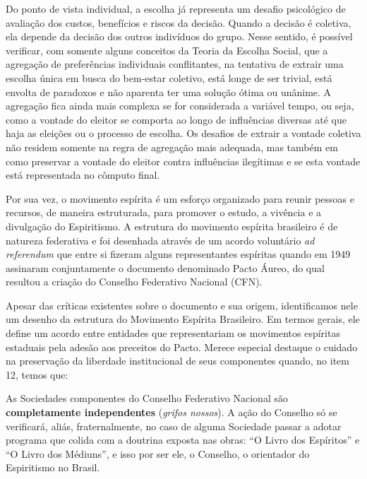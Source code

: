 \begin{citacao}
	Do ponto de vista individual, a escolha já representa um desafio psicológico de avaliação dos custos, benefícios e riscos da decisão. Quando a decisão é coletiva, ela depende da decisão dos outros indivíduos do grupo. Nesse sentido, é possível verificar, com somente alguns conceitos da Teoria da Escolha Social, que a agregação de preferências individuais conflitantes, na tentativa de extrair uma escolha única em busca do bem-estar coletivo, está longe de ser trivial, está envolta de paradoxos e não aparenta ter uma solução ótima ou unânime. A agregação fica ainda mais complexa se for considerada a variável tempo, ou seja, como a vontade do eleitor se comporta ao longo de influências diversas até que haja as eleições ou o processo de escolha. Os desafios de extrair a vontade coletiva não residem somente na regra de agregação mais adequada, mas também em como preservar a vontade do eleitor contra influências ilegítimas e se esta vontade está representada no cômputo final.
\end{citacao}



Por sua vez, o movimento espírita é um esforço organizado para reunir pessoas e recursos, de maneira estruturada, para promover o estudo, a vivência e a divulgação do Espiritismo. A estrutura do movimento espírita brasileiro é de natureza federativa e foi desenhada através de um acordo voluntário \textit{ad referendum} que entre si fizeram alguns representantes espíritas quando em 1949 assinaram conjuntamente o documento denominado Pacto Áureo\cite{pactoaureo2012}, do qual resultou a criação do Conselho Federativo Nacional (CFN). 

Apesar das críticas existentes sobre o documento e sua origem, identificamos nele um desenho da estrutura do Movimento Espírita Brasileiro. Em termos gerais, ele define um acordo entre entidades que representariam os movimentos espíritas estaduais pela adesão aos preceitos do Pacto. Merece especial destaque o cuidado na preservação da liberdade institucional de seus componentes quando, no item 12, temos que:


\begin{citacao}
As Sociedades componentes do Conselho Federativo Nacional são \textbf{completamente independentes} (\emph{grifos nossos}). A ação do Conselho só se verificará, aliás, fraternalmente, no caso de alguma Sociedade passar a adotar programa que colida com a doutrina exposta nas obras: “O Livro dos Espíritos” e “O Livro dos Médiuns”, e isso por ser ele, o Conselho, o orientador do Espiritismo no Brasil.
\end{citacao}

